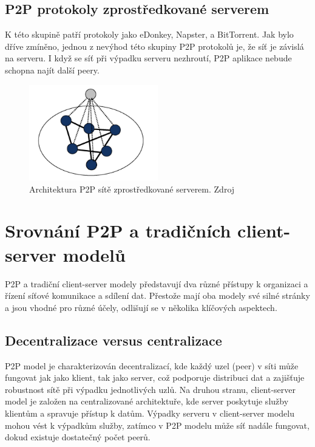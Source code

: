 \documentclass[10pt,twoside,czech,a4paper]{article}
\begin{document}
\subsection{P2P protokoly zprostředkované serverem}

K této skupině patří protokoly jako eDonkey, Napster, a BitTorrent.
Jak bylo dříve zmíněno, jednou z nevýhod této skupiny P2P protokolů je, že síť je závislá na serveru.
I když se síť při výpadku serveru nezhroutí, P2P aplikace nebude schopna najít další peery\cite{Lui2002}.

\begin{figure}[ht]
	\centering
	\includegraphics[width=0.5\textwidth]{server-mediated-p2p.png}
	\caption{Architektura P2P sítě zprostředkované serverem. Zdroj \cite{Leong2007}}
	\label{fig:server-mediated-p2p}
\end{figure}


\section{Srovnání P2P a tradičních client-server modelů}

P2P a tradiční client-server modely představují dva různé přístupy k organizaci a řízení síťové komunikace a sdílení dat.
Přestože mají oba modely své silné stránky a jsou vhodné pro různé účely, odlišují se v několika klíčových aspektech.

\subsection{Decentralizace versus centralizace}

P2P model je charakterizován decentralizací, kde každý uzel (peer) v síti může fungovat jak jako klient, tak jako server, což podporuje distribuci dat a zajišťuje robustnost sítě při výpadku jednotlivých uzlů.
Na druhou stranu, client-server model je založen na centralizované architektuře, kde server poskytuje služby klientům a spravuje přístup k datům.
Výpadky serveru v client-server modelu mohou vést k výpadkům služby, zatímco v P2P modelu může síť nadále fungovat, dokud existuje dostatečný počet peerů.
\end{document}
